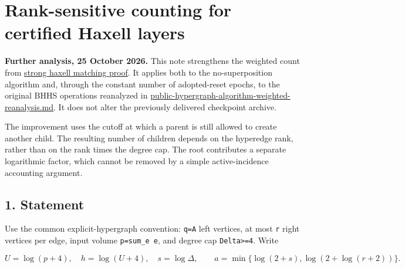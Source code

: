 
\hypertarget{af-6a8212874a-rank-sensitive-counting-for-certified-haxell-layers}{%
\section{Rank-sensitive counting for certified Haxell layers}\label{af-6a8212874a-rank-sensitive-counting-for-certified-haxell-layers}}

\textbf{Further analysis, 25 October 2026.} This note strengthens the weighted count from \href{https://github.com/icekylinx/algorithm-frontier/blob/main/problems/strong-haxell-matching/proof.md}{strong haxell matching proof}. It applies both to the no-superposition algorithm and, through the constant number of adopted-reset epochs, to the original BHHS operations reanalyzed in \href{https://github.com/icekylinx/algorithm-frontier/blob/main/manuscripts/matching-and-routing/public-hypergraph-algorithm-weighted-reanalysis.md}{public-hypergraph-algorithm-weighted-reanalysis.md}. It does not alter the previously delivered checkpoint archive.

The improvement uses the cutoff at which a parent is still allowed to create another child. The resulting number of children depends on the hyperedge rank, rather than on the rank times the degree cap. The root contributes a separate logarithmic factor, which cannot be removed by a simple active-incidence accounting argument.

\hypertarget{af-6a8212874a-statement}{%
\subsection{1. Statement}\label{af-6a8212874a-statement}}

Use the common explicit-hypergraph convention: \texttt{q=\textbar{}A\textbar{}} left vertices, at most \texttt{r} right vertices per edge, input volume \texttt{p=sum\_e\ \textbar{}e\textbar{}}, and degree cap \texttt{Delta\textgreater{}=4}. Write

\[
U=\log(p+4),\quad h=\log(U+4),\quad s=\log\Delta,
 \qquad
 a=\min\{\log(2+s),\log(2+\log(r+2))\}.
 \tag{1}
\]

